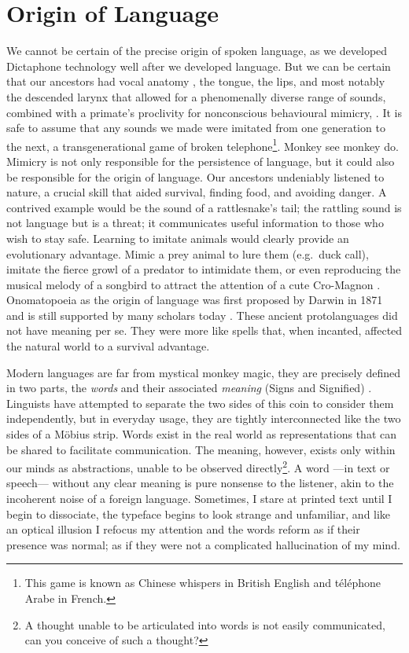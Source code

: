 \section{Origin of Language}
We cannot be certain of the precise origin of spoken language, as we developed Dictaphone technology well after we developed language. But we can be certain that our ancestors had vocal anatomy \cite{ghazanfar2008evolution}, the tongue, the lips, and most notably the descended larynx that allowed for a phenomenally diverse range of sounds, combined with a primate's proclivity for nonconscious behavioural mimicry, \cite{whiten2000primate, castro2004evolution}. It is safe to assume that any sounds we made were imitated from one generation to the next, a transgenerational game of broken telephone\footnote{This game is known as Chinese whispers in British English and téléphone Arabe in French.}. Monkey see monkey do. Mimicry is not only responsible for the persistence of language, but it could also be responsible for the origin of language. Our ancestors undeniably listened to nature, a crucial skill that aided survival, finding food, and avoiding danger. A contrived example would be the sound of a rattlesnake's tail; the rattling sound is not language but is a threat; it communicates useful information to those who wish to stay safe. Learning to imitate animals would clearly provide an evolutionary advantage. Mimic a prey animal to lure them (e.g.\ duck call), imitate the fierce growl of a predator to intimidate them, or even reproducing the musical melody of a songbird to attract the attention of a cute Cro-Magnon . Onomatopoeia as the origin of language was first proposed by Darwin in 1871 \cite{darwin1871descent} and is still supported by many scholars today \cite{wood2000human, mithen2006singing, de2017evolution}. These ancient protolanguages did not have meaning per se. They were more like spells that, when incanted, affected the natural world to a survival advantage. 

Modern languages are far from mystical monkey magic, they are precisely defined in two parts, the \textit{words} and their associated \textit{meaning} (Signs and Signified) \cite{chandler2017semiotics, de1989cours}. Linguists have attempted to separate the two sides of this coin to consider them independently, but in everyday usage, they are tightly interconnected like the two sides of a M{\"o}bius strip. Words exist in the real world as representations that can be shared to facilitate communication. The meaning, however, exists only within our minds as abstractions, unable to be observed directly\footnote{A thought unable to be articulated into words is not easily communicated, can you conceive of such a thought?}. A word ---in text or speech--- without any clear meaning is pure nonsense to the listener, akin to the incoherent noise of a foreign language. Sometimes, I stare at printed text until I begin to dissociate, the typeface begins to look strange and unfamiliar, and like an optical illusion I refocus my attention and the words reform as if their presence was normal; as if they were not a complicated hallucination of my mind.

